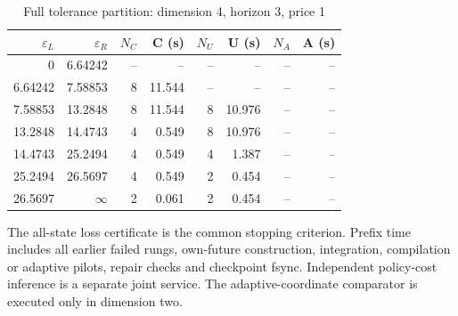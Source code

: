 \begin{table}[htbp]
\centering
\caption{Full tolerance partition: dimension 4, horizon 3, price 1}\label{tab:frontier-full48-4-3-1}
\footnotesize
\begin{tabular}{rrrrrrrr}
\toprule
$\varepsilon_L$ & $\varepsilon_R$ & $N_C$ & C (s) & $N_U$ & U (s) & $N_A$ & A (s)\\
\midrule
0 & 6.64242 & -- & -- & -- & -- & -- & -- \\
6.64242 & 7.58853 & 8 & 11.544 & -- & -- & -- & -- \\
7.58853 & 13.2848 & 8 & 11.544 & 8 & 10.976 & -- & -- \\
13.2848 & 14.4743 & 4 & 0.549 & 8 & 10.976 & -- & -- \\
14.4743 & 25.2494 & 4 & 0.549 & 4 & 1.387 & -- & -- \\
25.2494 & 26.5697 & 4 & 0.549 & 2 & 0.454 & -- & -- \\
26.5697 & $\infty$ & 2 & 0.061 & 2 & 0.454 & -- & -- \\
\bottomrule
\end{tabular}
\begin{minipage}{0.97\linewidth}\footnotesize\vspace{3pt}
The all-state loss certificate is the common stopping criterion. Prefix time includes all earlier failed rungs, own-future construction, integration, compilation or adaptive pilots, repair checks and checkpoint fsync. Independent policy-cost inference is a separate joint service. The adaptive-coordinate comparator is executed only in dimension two.
\end{minipage}
\end{table}
